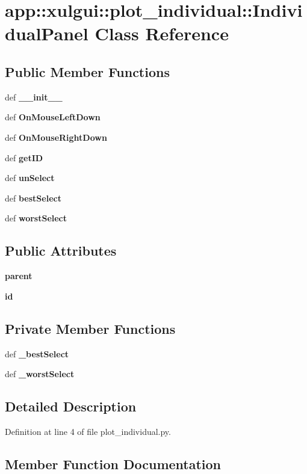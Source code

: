 \section{app::xulgui::plot\_\-individual::IndividualPanel Class Reference}
\label{classapp_1_1xulgui_1_1plot__individual_1_1IndividualPanel}
\subsection*{Public Member Functions}
\begin{CompactItemize}
\item 
def {\bf \_\-\_\-init\_\-\_\-}
\item 
def {\bf OnMouseLeftDown}
\item 
def {\bf OnMouseRightDown}
\item 
def {\bf getID}
\item 
def {\bf unSelect}
\item 
def {\bf bestSelect}
\item 
def {\bf worstSelect}
\end{CompactItemize}
\subsection*{Public Attributes}
\begin{CompactItemize}
\item 
{\bf parent}
\item 
{\bf id}
\end{CompactItemize}
\subsection*{Private Member Functions}
\begin{CompactItemize}
\item 
def {\bf \_\-bestSelect}
\item 
def {\bf \_\-worstSelect}
\end{CompactItemize}


\subsection{Detailed Description}


Definition at line 4 of file plot\_\-individual.py.

\subsection{Member Function Documentation}
